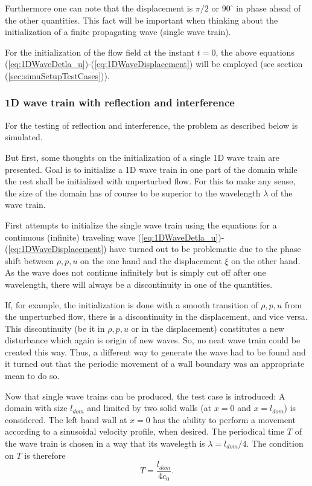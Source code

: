 \documentclass{report}
\begin{document}
Furthermore one can note that the displacement is $\pi/2$ or $90^\circ$ in phase ahead of the other quantities. This fact will be important when thinking about the initialization of a finite propagating wave (single wave train). 

For the initialization of the flow field at the instant $t=0$, the above equations (\ref{eq:1DWaveDetla_u})-(\ref{eq:1DWaveDisplacement}) will be employed (see section (\ref{sec:simuSetupTestCases})).


\subsubsection{1D wave train with reflection and interference}
For the testing of reflection and interference, the problem as described below is simulated.

But first, some thoughts on the initialization of a single 1D wave train are presented.
Goal is to initialize a 1D wave train in one part of the domain while the rest shall be initialized with unperturbed flow. For this to make any sense, the size of the domain has of course to be superior to the wavelength $\lambda$ of the wave train. 

First attempts to initialize the single wave train using the equations for a continuous (infinite) traveling wave (\ref{eq:1DWaveDetla_u})-(\ref{eq:1DWaveDisplacement}) have turned out to be problematic due to the phase shift between $\rho,p,u$ on the one hand and the displacement $\xi$ on the other hand. As the wave does not continue infinitely but is simply cut off after one wavelength, there will always be a discontinuity in one of the quantities.  

If, for example, the initialization is done with a smooth transition of $\rho,p,u$ from the unperturbed flow, there is a discontinuity in the displacement, and vice versa. This discontinuity (be it in $\rho,p,u$ or in the displacement) constitutes a new disturbance which again is origin of new waves. So, no neat wave train could be created this way. 
Thus, a different way to generate the wave had to be found and it turned out that the periodic movement of a wall boundary was an appropriate mean to do so. 

Now that single wave trains can be produced, the test case is introduced:
A domain with size $l_{\mathit{dom}}$ and limited by two solid walls (at $x=0$ and $x=l_{\mathit{dom}}$) is considered. The left hand wall at $x=0$ has the ability to perform a movement according to a sinusoidal velocity profile, when desired.
The periodical time $T$ of the wave train is chosen in a way that its wavelegth is
$\lambda=l_{\mathit{dom}}/4$. The condition on $T$ is therefore
\begin{equation}
 T=\frac{l_{\mathit{dom}}}{4 c_0}.
\end{equation}
\end{document}
